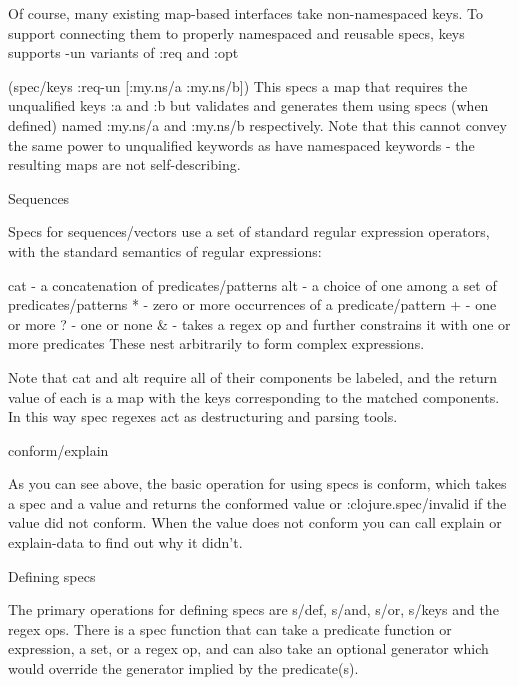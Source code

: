 Of course, many existing map-based interfaces take non-namespaced keys. To support connecting them to properly namespaced and reusable specs, keys supports -un variants of :req and :opt

(spec/keys :req-un [:my.ns/a :my.ns/b])
This specs a map that requires the unqualified keys :a and :b but validates and generates them using specs (when defined) named :my.ns/a and :my.ns/b respectively. Note that this cannot convey the same power to unqualified keywords as have namespaced keywords - the resulting maps are not self-describing.

Sequences

Specs for sequences/vectors use a set of standard regular expression operators, with the standard semantics of regular expressions:

cat - a concatenation of predicates/patterns
alt - a choice of one among a set of predicates/patterns
* - zero or more occurrences of a predicate/pattern
+ - one or more
? - one or none
\& - takes a regex op and further constrains it with one or more predicates
These nest arbitrarily to form complex expressions.

Note that cat and alt require all of their components be labeled, and the return value of each is a map with the keys corresponding to the matched components. In this way spec regexes act as destructuring and parsing tools.

conform/explain

As you can see above, the basic operation for using specs is conform, which takes a spec and a value and returns the conformed value or :clojure.spec/invalid if the value did not conform. When the value does not conform you can call explain or explain-data to find out why it didn’t.

Defining specs

The primary operations for defining specs are s/def, s/and, s/or, s/keys and the regex ops. There is a spec function that can take a predicate function or expression, a set, or a regex op, and can also take an optional generator which would override the generator implied by the predicate(s).

